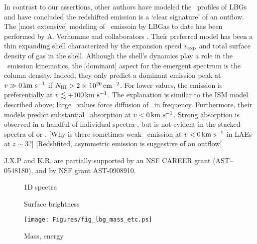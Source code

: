 \documentclass[12pt,preprint]{aastex}
\begin{document}
In contrast to our assertions,
other authors have modeled the \lya\ profiles of LBGs and have
concluded the redshifted emission is a `clear signature' of an
outflow.
The [most extensive] modeling of \lya\ emissoin by LBGas to date has
been performed by A. Verhomme and collaborators
\citep{verhommea,verhommeb}.  Their preferred model has been a thin
expanding shell characterized by the expansion speed $v_{\rm exp}$ and
total surface density of  gas in the shell.  Although the
shell's dynamics play a role in the \lya\ emission kinematics, the
[dominant] aspect for the emergent spectrum is the  column
density.  Indeed, they only predict a dominant emission peak at $v \gg
0 \, {\rm km~s^{-1}}$ if $N_{\rm HI} > 2{\; \times \; 10^{20}} \, {\rm cm^{-2}}$.  For lower values, the
emission is preferentially at $v \lesssim +100 \, {\rm km~s^{-1}}$.  The
explanation is similar to the ISM model described above;  large \nhi\
values force diffusion of \lya\ in frequency.  Furthermore, their
models predict substantial \lya\ absorption at $v < 0 \, {\rm km~s^{-1}}$.  
Strong absorption is observed in a handful of individual spectra
\citep[e.g.][]{cb58,dessauges}, but is not evident in the stacked
spectra of \cite{shapley93} or \cite{steidel+10}.  
[Why is there sometimes weak \lya\ emission at $v < 0 \, {\rm km~s^{-1}}$ in LAEs
at $z \sim 3$?]
[Redshfited, asymmetric emission is suggestive of an outflow]


\acknowledgments

J.X.P and K.R. are partially supported
by an NSF CAREER grant (AST--0548180), and 
by NSF grant AST-0908910.

\clearpage

%
%



\clearpage

%

\begin{figure}
\caption{
1D spectra
}
\label{fig:1D}
\end{figure}

\begin{figure}
\caption{
Surface brightness
}
\label{fig:SB}
\end{figure}

\begin{figure}
\texttt{[image: Figures/fig\_lbg\_mass\_etc.ps]}
\caption{
Mass, energy
}
\label{fig:mass_energy}
\end{figure}
\end{document}
